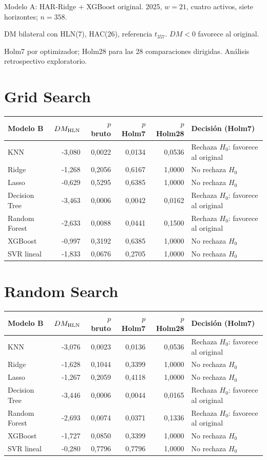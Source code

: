 \documentclass[11pt]{article}
\begin{document}
\noindent Modelo A: HAR-Ridge + XGBoost original. 2025, $w=21$, cuatro activos, siete horizontes; $n=358$.
\par DM bilateral con HLN(7), HAC(26), referencia $t_{357}$. $DM<0$ favorece al original.
\par Holm7 por optimizador; Holm28 para las 28 comparaciones dirigidas. Análisis retrospectivo exploratorio.
\section*{Grid Search}
\begin{center}\small\begin{tabular}{lrrrrl}\toprule
Modelo B & $DM_{\rm HLN}$ & $p$ bruto & $p$ Holm7 & $p$ Holm28 & Decisión (Holm7)\\\midrule
KNN & -3,080 & 0,0022 & 0,0134 & 0,0536 & Rechaza $H_0$: favorece al original\\
Ridge & -1,268 & 0,2056 & 0,6167 & 1,0000 & No rechaza $H_0$\\
Lasso & -0,629 & 0,5295 & 0,6385 & 1,0000 & No rechaza $H_0$\\
Decision Tree & -3,463 & 0,0006 & 0,0042 & 0,0162 & Rechaza $H_0$: favorece al original\\
Random Forest & -2,633 & 0,0088 & 0,0441 & 0,1500 & Rechaza $H_0$: favorece al original\\
XGBoost & -0,997 & 0,3192 & 0,6385 & 1,0000 & No rechaza $H_0$\\
SVR lineal & -1,833 & 0,0676 & 0,2705 & 1,0000 & No rechaza $H_0$\\
\bottomrule\end{tabular}\end{center}
\section*{Random Search}
\begin{center}\small\begin{tabular}{lrrrrl}\toprule
Modelo B & $DM_{\rm HLN}$ & $p$ bruto & $p$ Holm7 & $p$ Holm28 & Decisión (Holm7)\\\midrule
KNN & -3,076 & 0,0023 & 0,0136 & 0,0536 & Rechaza $H_0$: favorece al original\\
Ridge & -1,628 & 0,1044 & 0,3399 & 1,0000 & No rechaza $H_0$\\
Lasso & -1,267 & 0,2059 & 0,4118 & 1,0000 & No rechaza $H_0$\\
Decision Tree & -3,446 & 0,0006 & 0,0044 & 0,0165 & Rechaza $H_0$: favorece al original\\
Random Forest & -2,693 & 0,0074 & 0,0371 & 0,1336 & Rechaza $H_0$: favorece al original\\
XGBoost & -1,727 & 0,0850 & 0,3399 & 1,0000 & No rechaza $H_0$\\
SVR lineal & -0,280 & 0,7796 & 0,7796 & 1,0000 & No rechaza $H_0$\\
\bottomrule\end{tabular}\end{center}
\end{document}
